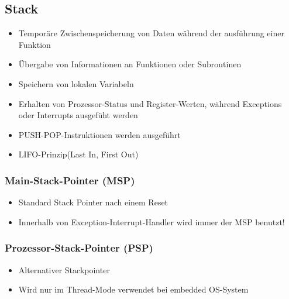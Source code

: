 \subsection{Stack}
\begin{multicols}{2}
    \begin{minipage}{0.5\textwidth}
        \begin{itemize}
            \item Temporäre Zwischenspeicherung von Daten während der ausführung einer Funktion
            \item Übergabe von Informationen an Funktionen oder Subroutinen
            \item Speichern von lokalen Variabeln
            \item Erhalten von Prozessor-Status und Register-Werten, während Exceptions oder Interrupts ausgefüht werden
            \item PUSH-POP-Instruktionen werden ausgeführt
            \item LIFO-Prinzip(Last In, First Out)
        \end{itemize}
    \end{minipage}
    
    \begin{minipage}{0.5\textwidth}
        \subsubsection{Main-Stack-Pointer (MSP)}
        \begin{itemize}
            \item Standard Stack Pointer nach einem Reset
            \item Innerhalb von Exception-Interrupt-Handler wird immer der MSP benutzt!
            \end{itemize}
        \subsubsection{Prozessor-Stack-Pointer (PSP)}
        \begin{itemize}
            \item Alternativer Stackpointer
            \item Wird nur im Thread-Mode verwendet
            \subitem \rightarrow bei embedded OS-System
        \end{itemize}   
    \end{minipage}
\end{multicols}


















